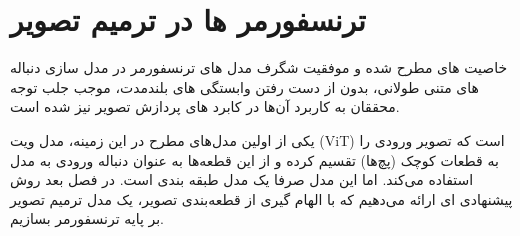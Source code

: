 \section{ترنسفورمر ها در ترمیم تصویر}

خاصیت های مطرح شده و موفقیت شگرف مدل های ترنسفورمر
\cite{radfordLanguageModelsAre2019}
\cite{brownLanguageModelsAre2020}
\cite{openaiGPT4TechnicalReport2024}
در مدل سازی دنباله های متنی طولانی، بدون از دست رفتن وابستگی های بلندمدت، موجب جلب توجه محققان به کاربرد آن‌ها در کابرد های پردازش تصویر نیز شده است.
\cite{liuSwinTransformerHierarchical2021}


یکی از اولین مدل‌های مطرح در این زمینه، مدل ویت (ViT) 
\cite{dosovitskiyImageWorth16x162021}
است که تصویر ورودی را به قطعات کوچک (پچ‌ها) تقسیم کرده و از این قطعه‌ها به عنوان دنباله ورودی به مدل استفاده می‌کند. اما این مدل صرفا یک مدل طبقه بندی است. در فصل بعد روش پیشنهادی ای ارائه می‌دهیم که با الهام گیری از قطعه‌بندی تصویر، یک مدل ترمیم تصویر بر پایه ترنسفورمر بسازیم. 





